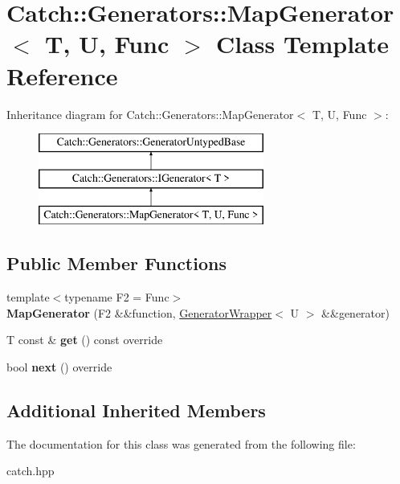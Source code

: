 \hypertarget{classCatch_1_1Generators_1_1MapGenerator}{}\section{Catch\+::Generators\+::Map\+Generator$<$ T, U, Func $>$ Class Template Reference}
\label{classCatch_1_1Generators_1_1MapGenerator}
Inheritance diagram for Catch\+::Generators\+::Map\+Generator$<$ T, U, Func $>$\+:\begin{figure}[H]
\begin{center}
\leavevmode
\includegraphics[height=3.000000cm]{classCatch_1_1Generators_1_1MapGenerator}
\end{center}
\end{figure}
\subsection*{Public Member Functions}
\begin{DoxyCompactItemize}
\item 
\mbox{\label{classCatch_1_1Generators_1_1MapGenerator_a525c7eaf53ad220ee7add534aff2522c}} 
{\footnotesize template$<$typename F2  = Func$>$ }\\{\bfseries Map\+Generator} (F2 \&\&function, \mbox{\hyperlink{classCatch_1_1Generators_1_1GeneratorWrapper}{Generator\+Wrapper}}$<$ U $>$ \&\&generator)
\item 
\mbox{\label{classCatch_1_1Generators_1_1MapGenerator_a199d377afba00519f202c59b4b488235}} 
T const  \& {\bfseries get} () const override
\item 
\mbox{\label{classCatch_1_1Generators_1_1MapGenerator_aa07e2f12d38ae060c30cc30d9dc236c5}} 
bool {\bfseries next} () override
\end{DoxyCompactItemize}
\subsection*{Additional Inherited Members}


The documentation for this class was generated from the following file\+:\begin{DoxyCompactItemize}
\item 
catch.\+hpp\end{DoxyCompactItemize}
